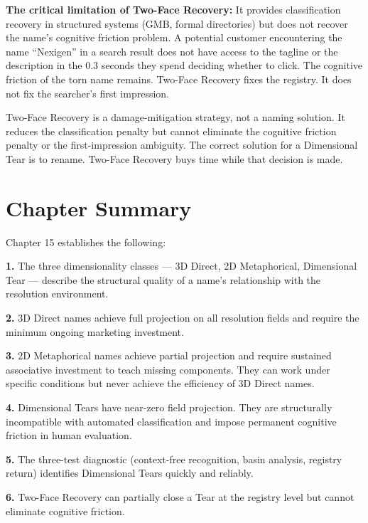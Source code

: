 \documentclass[12pt, openany]{book}
\theoremstyle{thmstyle}
\theoremstyle{defstyle}
\begin{document}
\textbf{The critical limitation of Two-Face Recovery:} It provides classification recovery in structured systems (GMB, formal directories) but does not recover the name's cognitive friction problem. A potential customer encountering the name ``Nexigen'' in a search result does not have access to the tagline or the description in the 0.3 seconds they spend deciding whether to click. The cognitive friction of the torn name remains. Two-Face Recovery fixes the registry. It does not fix the searcher's first impression.

\begin{warnbox}
Two-Face Recovery is a damage-mitigation strategy, not a naming solution. It reduces the classification penalty but cannot eliminate the cognitive friction penalty or the first-impression ambiguity. The correct solution for a Dimensional Tear is to rename. Two-Face Recovery buys time while that decision is made.
\end{warnbox}

\section{Chapter Summary}

Chapter 15 establishes the following:

\textbf{1.} The three dimensionality classes --- 3D Direct, 2D Metaphorical, Dimensional Tear --- describe the structural quality of a name's relationship with the resolution environment.

\textbf{2.} 3D Direct names achieve full projection on all resolution fields and require the minimum ongoing marketing investment.

\textbf{3.} 2D Metaphorical names achieve partial projection and require sustained associative investment to teach missing components. They can work under specific conditions but never achieve the efficiency of 3D Direct names.

\textbf{4.} Dimensional Tears have near-zero field projection. They are structurally incompatible with automated classification and impose permanent cognitive friction in human evaluation.

\textbf{5.} The three-test diagnostic (context-free recognition, basin analysis, registry return) identifies Dimensional Tears quickly and reliably.

\textbf{6.} Two-Face Recovery can partially close a Tear at the registry level but cannot eliminate cognitive friction.
\end{document}
